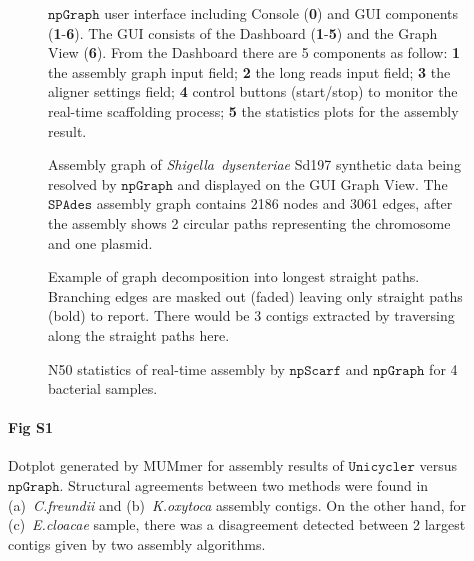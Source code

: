 \documentclass[10pt,letterpaper]{article}
\newcommand{\npscarf}{$\mathtt{npScarf}$}
\newcommand{\npgraph}{$\mathtt{npGraph}$}
\newcommand{\unicycler}{$\mathtt{Unicycler}$}
\newcommand{\spades}{$\mathtt{SPAdes}$}
\begin{document}
\begin{figure}[!hpt]
\centering
\caption{\npgraph{} user interface including Console (\textbf{0}) and GUI components (\textbf{1}-\textbf{6}). The GUI consists of the Dashboard (\textbf{1}-\textbf{5}) and the Graph View (\textbf{6}). From the Dashboard there are 5 components as follow: \textbf{1} the assembly graph input field; \textbf{2} the long reads input field; \textbf{3} the aligner settings field; \textbf{4} control buttons (start/stop) to monitor the real-time scaffolding process; \textbf{5} the statistics plots for the assembly result.}
\label{figure:npgraph_gui}
\end{figure}


\begin{figure}[!hpt]
\centering
\caption{Assembly graph of \emph{Shigella~dysenteriae} Sd197 synthetic data being resolved by \npgraph{} and displayed on the GUI Graph View. The \spades{} assembly graph contains 2186 nodes and 3061 edges, after the assembly shows 2 circular paths representing the chromosome and one plasmid.}
\label{figure:npgraph_graphview}
\end{figure}


\begin{figure}[!hpt]
\centering
\caption{Example of graph decomposition into longest straight paths. Branching edges are masked out (faded) leaving only straight paths (bold) to report. There would be 3 contigs extracted by traversing along the straight paths here.}
\label{figure:npgraph_decompose}
\end{figure}


\begin{figure}[!hbt]
\centering
\caption{N50 statistics of real-time assembly by \npscarf{} and \npgraph{} for 4 bacterial samples.}
\label{F:npgraph_rt}
\end{figure}

\paragraph*{Fig S1}
Dotplot generated by MUMmer for assembly results of \unicycler{} versus \npgraph{}. Structural agreements between two methods were found in (a)~\emph{C.freundii} and (b)~\emph{K.oxytoca} assembly contigs. On the other hand, for (c)~\emph{E.cloacae} sample, there was a disagreement detected between 2 largest contigs given by two assembly algorithms.
\end{document}
